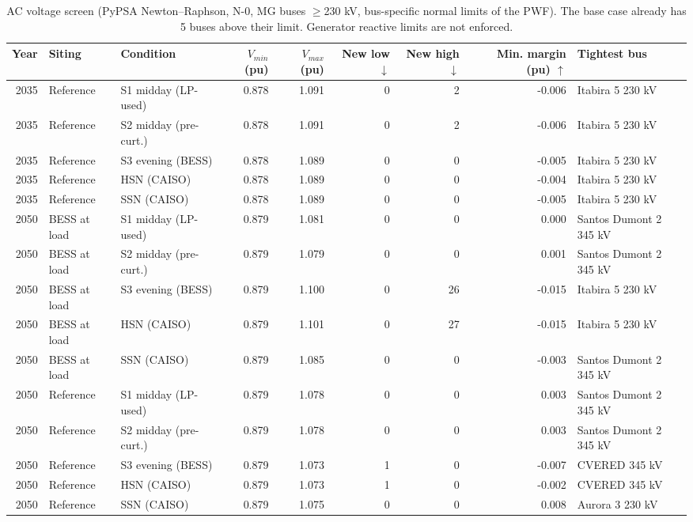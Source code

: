 \begin{table}[!htbp]
\centering
\scriptsize
\caption{AC voltage screen (PyPSA Newton--Raphson, N-0, MG buses $\ge$230 kV, bus-specific normal limits of the PWF). The base case already has 5 buses above their limit. Generator reactive limits are not enforced.}
\label{tab:ac}
\begin{adjustbox}{max width=\linewidth}
\begin{tabular}{rllrrrrrl}
\toprule
Year & Siting & Condition & $V_{min}$ (pu) & $V_{max}$ (pu) & New low $\downarrow$ & New high $\downarrow$ & Min. margin (pu) $\uparrow$ & Tightest bus \\
\midrule
2035 & Reference & S1 midday (LP-used) & 0.878 & 1.091 & 0 & 2 & -0.006 & Itabira 5 230 kV \\
2035 & Reference & S2 midday (pre-curt.) & 0.878 & 1.091 & 0 & 2 & -0.006 & Itabira 5 230 kV \\
2035 & Reference & S3 evening (BESS) & 0.878 & 1.089 & 0 & 0 & -0.005 & Itabira 5 230 kV \\
2035 & Reference & HSN (CAISO) & 0.878 & 1.089 & 0 & 0 & -0.004 & Itabira 5 230 kV \\
2035 & Reference & SSN (CAISO) & 0.878 & 1.089 & 0 & 0 & -0.005 & Itabira 5 230 kV \\
2050 & BESS at load & S1 midday (LP-used) & 0.879 & 1.081 & 0 & 0 & 0.000 & Santos Dumont 2 345 kV \\
2050 & BESS at load & S2 midday (pre-curt.) & 0.879 & 1.079 & 0 & 0 & 0.001 & Santos Dumont 2 345 kV \\
2050 & BESS at load & S3 evening (BESS) & 0.879 & 1.100 & 0 & 26 & -0.015 & Itabira 5 230 kV \\
2050 & BESS at load & HSN (CAISO) & 0.879 & 1.101 & 0 & 27 & -0.015 & Itabira 5 230 kV \\
2050 & BESS at load & SSN (CAISO) & 0.879 & 1.085 & 0 & 0 & -0.003 & Santos Dumont 2 345 kV \\
2050 & Reference & S1 midday (LP-used) & 0.879 & 1.078 & 0 & 0 & 0.003 & Santos Dumont 2 345 kV \\
2050 & Reference & S2 midday (pre-curt.) & 0.879 & 1.078 & 0 & 0 & 0.003 & Santos Dumont 2 345 kV \\
2050 & Reference & S3 evening (BESS) & 0.879 & 1.073 & 1 & 0 & -0.007 & CVERED 345 kV \\
2050 & Reference & HSN (CAISO) & 0.879 & 1.073 & 1 & 0 & -0.002 & CVERED 345 kV \\
2050 & Reference & SSN (CAISO) & 0.879 & 1.075 & 0 & 0 & 0.008 & Aurora 3 230 kV \\
\bottomrule
\end{tabular}
\end{adjustbox}
\end{table}
